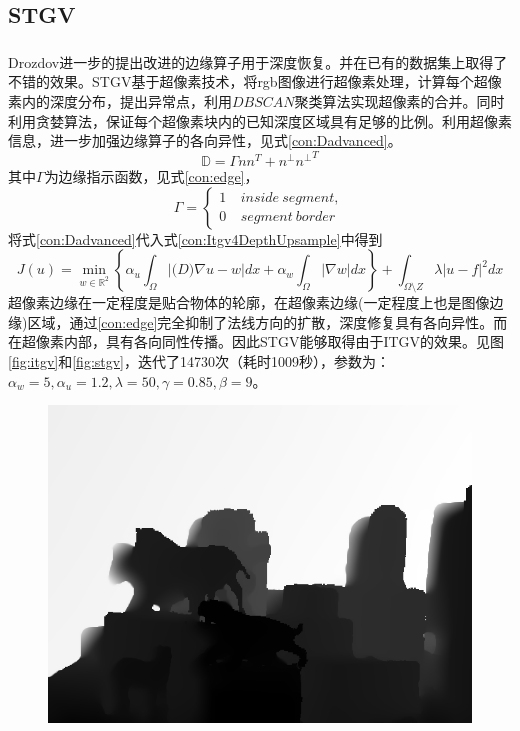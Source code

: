 \documentclass[UTF8]{ctexart}
\newcommand{\myciteup}[1]{\textsuperscript{\textsuperscript{\cite{#1}}}}
\begin{document}
\begin{sloppypar}
\subsection{STGV}
    Drozdov进一步的提出改进的边缘算子\myciteup{Drozdov2016}用于深度恢复。并在已有的数据集上取得了不错的效果。STGV基于超像素技术，将rgb图像进行超像素处理，计算每个超像素内的深度分布，提出异常点，利用$DBSCAN$聚类算法实现超像素的合并。同时利用贪婪算法，保证每个超像素块内的已知深度区域具有足够的比例。利用超像素信息，进一步加强边缘算子的各向异性，见式\eqref{con:Dadvanced}。
    \begin{equation}
        \mathbb{D} = \Gamma nn^T + n^{\perp}{n^{\perp}}^{T}
        \label{con:Dadvanced}
    \end{equation}
    其中$\Gamma$为边缘指示函数，见式\eqref{con:edge}，
    \begin{equation}
       \Gamma = \left\{
       \begin{aligned}
           1 \ & inside\ segment,\\
           0 \ & segment\ border
       \end{aligned}
       \right.
        \label{con:edge}
    \end{equation}
    将式\eqref{con:Dadvanced}代入式\eqref{con:Itgv4DepthUpsample}中得到
    \begin{equation}
        J(u) = \min\limits_{w \in \mathbb{R}^2}\left\{ \alpha_u \int_{\Omega}\left|\mathbb(D) \nabla u - w \right|dx + \alpha_w\int_{\Omega}\left|\nabla w\right|dx \right\} + \int_{\Omega\setminus Z}\lambda\left| u-f \right|^2 dx
        \label{con:stgvLossFun}
    \end{equation}
    超像素边缘在一定程度是贴合物体的轮廓，在超像素边缘(一定程度上也是图像边缘)区域，通过\eqref{con:edge}完全抑制了法线方向的扩散，深度修复具有各向异性。而在超像素内部，具有各向同性传播。因此STGV能够取得由于ITGV的效果。见图\ref{fig:itgv}和\ref{fig:stgv}，迭代了14730次（耗时1009秒），参数为：$\alpha_w=5,\alpha_u=1.2,\lambda=50,\gamma=0.85,\beta=9$。
    \begin{figure}[htbp]
        \begin{minipage}[t]{0.5\linewidth}
            \centering
            \includegraphics[width=0.9\linewidth]{figure/tgvl2_14730_1009s_noseg}

\end{minipage}
\end{figure}
\end{sloppypar}
\end{document}

